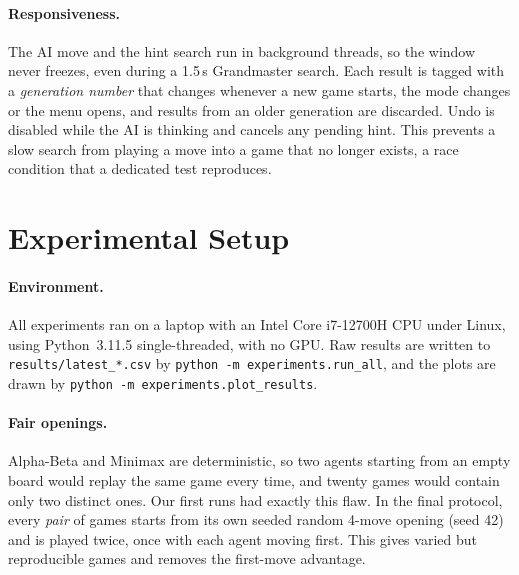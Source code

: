\documentclass[11pt,a4paper]{article}
\newcommand{\code}[1]{\texttt{\small #1}}
\begin{document}
\paragraph{Responsiveness.} The AI move and the hint search run in background threads, so the window never freezes, even during a 1.5\,s Grandmaster search. Each result is tagged with a \emph{generation number} that changes whenever a new game starts, the mode changes or the menu opens, and results from an older generation are discarded. Undo is disabled while the AI is thinking and cancels any pending hint. This prevents a slow search from playing a move into a game that no longer exists, a race condition that a dedicated test reproduces.

\section{Experimental Setup}\label{sec:setup}

\paragraph{Environment.} All experiments ran on a laptop with an Intel Core i7-12700H CPU under Linux, using Python~3.11.5 single-threaded, with no GPU. Raw results are written to \code{results/latest\_*.csv} by \code{python -m experiments.run\_all}, and the plots are drawn by \code{python -m experiments.plot\_results}.

\paragraph{Fair openings.} Alpha-Beta and Minimax are deterministic, so two agents starting from an empty board would replay the same game every time, and twenty games would contain only two distinct ones. Our first runs had exactly this flaw. In the final protocol, every \emph{pair} of games starts from its own seeded random 4-move opening (seed 42) and is played twice, once with each agent moving first. This gives varied but reproducible games and removes the first-move advantage.
\end{document}
